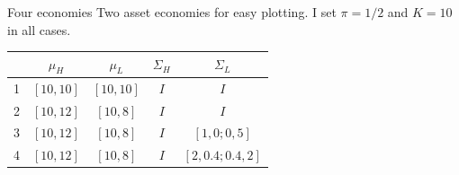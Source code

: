 \documentclass[
  ignorenonframetext,
]{beamer}
\begin{document}
\begin{frame}{Four economies}
\protect\hypertarget{four-economies}{}
Two asset economies for easy plotting. I set \(\pi = 1/2\) and \(K=10\)
in all cases.

\begin{table}
\begin{tabular}{ccccc}
  \toprule
  & $\mu_H$ & $\mu_L$ & $\Sigma_H$ & $\Sigma_L$ \\
  \midrule
  1 & $[10,10]$ & $[10,10]$ & $I$ & $I$ \\
  2 & $[10,12]$ & $[10,8]$ & $I$ & $I$ \\
  3 & $[10,12]$ & $[10,8]$ & $I$ & $[1, 0; 0, 5]$ \\
  4 & $[10,12]$ & $[10,8]$ & $I$ & $[2, 0.4; 0.4, 2]$ \\
\end{tabular}
\end{table}
\end{frame}
\end{document}
